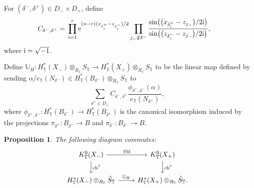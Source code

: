 \documentclass[pdftex]{sigma}
\newtheorem{Proposition}[Theorem]{Proposition}
 { \theoremstyle{definition}
\newtheorem{Definition}[Theorem]{Definition}
\newtheorem{Note}[Theorem]{Note}
\newtheorem{Example}[Theorem]{Example}
\newtheorem{Remark}[Theorem]{Remark} }
\numberwithin{equation}{section}
\newcommand{\UU}{\mathbb{U}}
\newcommand{\torus}{\mathbb{T}}
\newcommand{\FM}{\mathbb{FM}}
\DeclareMathOperator{\ch}{ch}
\newcommand{\z}{z}
\newcommand{\x}{x}
\begin{document}
For $(\delta^-, \delta^+) \in D_{-} \times D_{+}$, define
\begin{align}\label{CD}
C_{\delta^-, \delta^+}
={}& \prod_{i=1}^r {\rm e}^{(n-r)(x_{\delta^+_i} - z_{\delta^-_i})/2} \prod_{j_- \notin \delta^-} \frac{\sin\bigl(\bigl(\x_{\delta^+_i} - \z_{j_-}\bigr)/2 {\rm i}\bigr)}{\sin\bigl(\bigl(\z_{\delta^-_i} - \z_{j_-}\bigr)/2 {\rm i}\bigr)},
\end{align}
where ${\rm i} = \sqrt{-1}$.

\begin{Definition}
\label{d:UH0}
Define $\UU_H\colon H^*_\torus(X_{-})\otimes_{R_\torus} S_\torus \to H^*_\torus(X_{+})\otimes_{R_\torus} S_\torus$ to be the linear map defined by sending
$\alpha/e_\torus(N_{\delta^-}) \in H^*_\torus(B_{\delta^-})\otimes_{R_\torus} S_\torus$ to
\begin{equation}\label{e:UH}
\sum_{\delta^+ \in D_+} C_{\delta^-, \delta^+}
\frac{ \phi_{\delta^+, \delta^-}(\alpha)}{e_\torus(N_{\delta^+})},
\end{equation}
where $\phi_{\delta^+, \delta^-}\colon H^*_\torus(B_{\delta^-}) \to H^*_\torus(B_{\delta^+})$ is the canonical isomorphism induced by the projections $\pi_{\delta^+}\colon B_{\delta^+} \to B$ and $\pi_{\delta^-}\colon B_{\delta^-} \to B$.
\end{Definition}

\begin{Proposition}\label{p:Kcom}
The following diagram commutes:
\[
\begin{tikzcd}
K^0_\torus(X_{-}) \ar[r, "\FM"] \ar[d, "\ch^\torus"] & K^0_\torus(X_{+}) \ar[d, "\ch^\torus"] \\ H^*_\torus(X_{-})\otimes_{R_\torus} \hat S_\torus \ar[r, "\UU_H"] & H^*_\torus(X_{+})\otimes_{R_\torus} \hat S_\torus.
\end{tikzcd}
\]
\end{Proposition}
\end{document}
